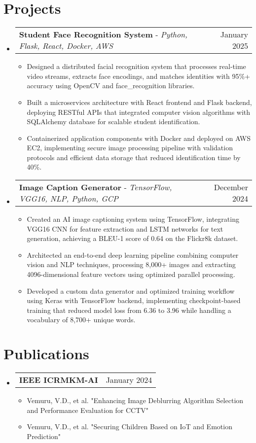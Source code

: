 \documentclass[letterpaper,10.5pt]{article}
\makeatletter
\newcommand{\resumeItem}[1]{
  \item{
    {#1 \vspace{-3pt}}
  }
}
\newcommand{\resumeProjectHeading}[2]{
    \item
    \begin{tabular*}{0.97\textwidth}{l@{\extracolsep{\fill}}r}
      #1 & #2 \\
    \end{tabular*}\vspace{-5pt}
}
\newcommand{\resumePublicationsHeading}[2]{
    \item
    \begin{tabular*}{0.97\textwidth}{l@{\extracolsep{\fill}}r}
      #1 & #2 \\
    \end{tabular*}\vspace{-6pt}
}
\newcommand{\resumeSubHeadingListStart}{\begin{itemize}[leftmargin=*]}
\newcommand{\resumeSubHeadingListEnd}{\end{itemize}}
\newcommand{\resumeItemListStart}{\begin{itemize}}
\newcommand{\resumeItemListEnd}{\end{itemize}\vspace{-6pt}}
\makeatother
\begin{document}
\section{Projects}
    \resumeSubHeadingListStart
      \resumeProjectHeading
          {\textbf{Student Face Recognition System} - \emph{Python, Flask, React, Docker, AWS}}{January 2025}
          \resumeItemListStart
            \resumeItem{Designed a distributed facial recognition system that processes real-time video streams, extracts face encodings, and matches identities with 95\%+ accuracy using OpenCV and face\_recognition libraries.}
            \resumeItem{Built a microservices architecture with React frontend and Flask backend, deploying RESTful APIs that integrated computer vision algorithms with SQLAlchemy database for scalable student identification.}
            \resumeItem{Containerized application components with Docker and deployed on AWS EC2, implementing secure image processing pipeline with validation protocols and efficient data storage that reduced identification time by 40\%.}
          \resumeItemListEnd
      \resumeProjectHeading
          {\textbf{Image Caption Generator} - \emph{TensorFlow, VGG16, NLP, Python, GCP}}{December 2024}
          \resumeItemListStart
            \resumeItem{Created an AI image captioning system using TensorFlow, integrating VGG16 CNN for feature extraction and LSTM networks for text generation, achieving a BLEU-1 score of 0.64 on the Flickr8k dataset.}
            \resumeItem{Architected an end-to-end deep learning pipeline combining computer vision and NLP techniques, processing 8,000+ images and extracting 4096-dimensional feature vectors using optimized parallel processing.}
            \resumeItem{Developed a custom data generator and optimized training workflow using Keras with TensorFlow backend, implementing checkpoint-based training that reduced model loss from 6.36 to 3.96 while handling a vocabulary of 8,700+ unique words.}
          \resumeItemListEnd
    \resumeSubHeadingListEnd

\section{Publications}
    \resumeSubHeadingListStart
      \resumePublicationsHeading
          {\textbf{IEEE ICRMKM-AI}}{January 2024}
          \resumeItemListStart
            \resumeItem{Vemuru, V.D., et al. "Enhancing Image Deblurring Algorithm Selection and Performance Evaluation for CCTV"}
            \resumeItem{Vemuru, V.D., et al. "Securing Children Based on IoT and Emotion Prediction"}
          \resumeItemListEnd
    \resumeSubHeadingListEnd
\end{document}
